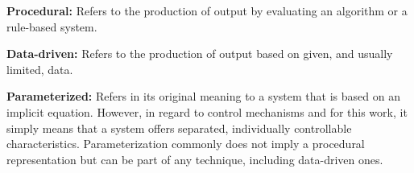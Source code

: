 \textbf{Procedural:} Refers to the production of output by evaluating an algorithm or a rule-based system.

\textbf{Data-driven:} Refers to the production of output based on given, and usually limited, data.

\textbf{Parameterized:} Refers in its original meaning to a system that is based on an implicit equation. However, in regard to control mechanisms and for this work, it simply means that a system offers separated, individually controllable characteristics. Parameterization commonly does not imply a procedural representation but can be part of any technique, including data-driven ones.


